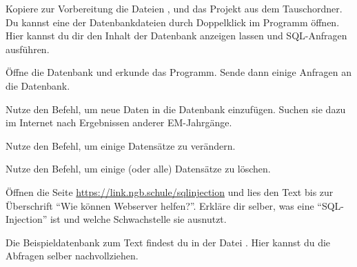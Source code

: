 \documentclass[10pt, a4paper, ngerman]{scrartcl}
\begin{document}
\ReiheTitel

Kopiere zur Vorbereitung die Dateien ,  und das Projekt  aus dem Tauschordner. Du kannst eine der Datenbankdateien durch Doppelklick im Programm  öffnen. Hier kannst du dir den Inhalt der Datenbank anzeigen lassen und SQL-Anfragen ausführen.

\begin{aufgabe}[icon=\iconPartner\,\iconLaptop]
	\begin{teilaufgaben}
		\teilaufgabe
		Öffne die Datenbank  und erkunde das Programm. Sende dann einige  Anfragen an die Datenbank.

		\teilaufgabe
		Nutze den  Befehl, um neue Daten in die Datenbank einzufügen. Suchen sie dazu im Internet nach Ergebnissen anderer EM-Jahrgänge.

		\teilaufgabe
		Nutze den  Befehl, um einige Datensätze zu verändern.

		\teilaufgabe
		Nutze den  Befehl, um einige (oder alle) Datensätze zu löschen.
	\end{teilaufgaben}


\end{aufgabe}

\begin{aufgabe}[icon=\iconPartner\,\iconLaptop]
	Öffnen die Seite \url{https://link.ngb.schule/sqlinjection} und lies den Text bis zur Überschrift \enquote{Wie können Webserver helfen?}. Erkläre dir selber, was eine \enquote{SQL-Injection} ist und welche Schwachstelle sie ausnutzt.

	Die Beispieldatenbank zum Text findest du in der Datei . Hier kannst du die Abfragen selber nachvollziehen.

\end{aufgabe}
\end{document}
